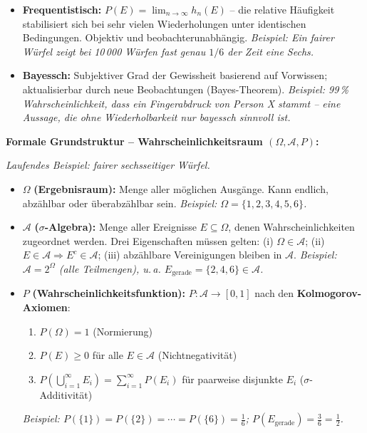\begin{itemize}[leftmargin=1.5em]
    \item \textbf{Frequentistisch:} $P(E) = \lim_{n\to\infty} h_n(E)$ -- die relative Häufigkeit stabilisiert sich bei sehr vielen Wiederholungen unter identischen Bedingungen. Objektiv und beobachterunabhängig. \textit{Beispiel: Ein fairer Würfel zeigt bei 10\,000 Würfen fast genau $1/6$ der Zeit eine Sechs.}

    \item \textbf{Bayessch:} Subjektiver Grad der Gewissheit basierend auf Vorwissen; aktualisierbar durch neue Beobachtungen (Bayes-Theorem). \textit{Beispiel: 99\,\% Wahrscheinlichkeit, dass ein Fingerabdruck von Person X stammt -- eine Aussage, die ohne Wiederholbarkeit nur bayessch sinnvoll ist.}
\end{itemize}

\medskip
\noindent\textbf{Formale Grundstruktur -- Wahrscheinlichkeitsraum $(\Omega, \mathcal{A}, P)$:}

\medskip
\noindent\textit{Laufendes Beispiel: fairer sechsseitiger Würfel.}

\begin{itemize}[leftmargin=1.5em]
    \item $\Omega$ \textbf{(Ergebnisraum):} Menge aller möglichen Ausgänge. Kann endlich, abzählbar oder überabzählbar sein. \textit{Beispiel: $\Omega = \{1,2,3,4,5,6\}$.}

    \item $\mathcal{A}$ \textbf{($\sigma$-Algebra):} Menge aller Ereignisse $E \subseteq \Omega$, denen Wahrscheinlichkeiten zugeordnet werden. Drei Eigenschaften müssen gelten: (i) $\Omega \in \mathcal{A}$; (ii) $E\in\mathcal{A} \Rightarrow E^c\in\mathcal{A}$; (iii) abzählbare Vereinigungen bleiben in $\mathcal{A}$. \textit{Beispiel: $\mathcal{A} = 2^\Omega$ (alle Teilmengen), u.\,a. $E_{\text{gerade}} = \{2,4,6\} \in \mathcal{A}$.}

    \item $P$ \textbf{(Wahrscheinlichkeitsfunktion):} $P:\mathcal{A}\to[0,1]$ nach den \textbf{Kolmogorov-Axiomen}:
    \begin{enumerate}[leftmargin=1.5em]
        \item $P(\Omega)=1$ \hfill (Normierung)
        \item $P(E)\geq 0$ für alle $E\in\mathcal{A}$ \hfill (Nichtnegativität)
        \item $P\!\left(\bigcup_{i=1}^\infty E_i\right)=\sum_{i=1}^\infty P(E_i)$ für paarweise disjunkte $E_i$ \hfill ($\sigma$-Additivität)
    \end{enumerate}
    \textit{Beispiel: $P(\{1\}) = P(\{2\}) = \cdots = P(\{6\}) = \tfrac{1}{6}$; $P(E_{\text{gerade}}) = \tfrac{3}{6} = \tfrac{1}{2}$.}
\end{itemize}

